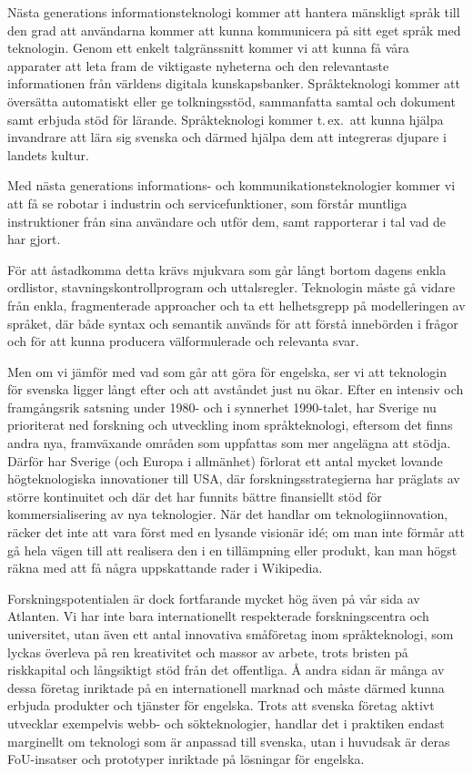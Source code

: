 \begin{multicols}{2}
Nästa generations informationsteknologi kommer att hantera mänskligt
språk till den grad att användarna kommer att kunna kommunicera på
sitt eget språk med teknologin. Genom ett enkelt talgränssnitt kommer
vi att kunna få våra apparater att \mbox{leta} fram de viktigaste
nyheterna och den relevant\-aste informationen från världens digitala
kunskaps\-banker. Språkteknologi kommer att översätta auto\-mat\-iskt
\mbox{eller} ge tolkningsstöd, sammanfatta samtal och doku\-ment samt
erbjuda stöd för lärande. Språkteknologi kommer t.\,ex.~att kunna
hjälpa invandrare att lära sig svenska och därmed hjälpa dem att
integrer\-as djupare i landets kultur.

Med nästa generations informations- och kom\-muni\-ka\-tions\-teknologier
kommer vi att få se robotar i indust\-rin och service\-funktioner, som
förstår munt\-liga instruktioner från sina användare och utför dem, samt
rapporterar i tal vad de har gjort.

För att åstadkomma detta krävs mjukvara som går långt bortom dagens
enkla ordlistor, stavnings\-kontroll\-program och uttalsregler. Teknologin
måste gå vidare från enkla, fragmenterade approacher och ta ett
helhetsgrepp på modelleringen av språket, där både syntax och semantik
används för att förstå innebörden i frågor och för att kunna producera
väl\-formu\-lerade och relevanta svar.

Men om vi jämför med vad som går att göra för engelska, ser vi att
teknologin för svenska ligger långt efter och att avståndet just nu
ökar. Efter en \mbox{intensiv} och framgångsrik satsning under 1980- och i
synnerhet 1990-talet, har Sverige nu prioriterat ned forskning och
utveckling inom språkteknologi, efter\-som det finns andra nya,
framväxande områden som uppfattas som mer angelägna att stödja.
Därför har Sverige (och Europa i allmänhet) förlorat ett antal mycket
lovande högteknologiska innovationer till USA, där
forskningsstrategierna har präglats av större kontinuitet och där det
har funnits bättre finansiellt stöd för kommersialisering av nya
teknologier. När det handlar om teknologiinnovation, räcker det inte
att vara först med en lysande visionär idé; om man inte förmår att gå
hela vägen till att realisera den i en tillämpning eller produkt, kan
man högst räkna med att få några uppskattande rader i Wikipedia.

Forskningspotentialen är dock fortfarande mycket hög även på vår sida
av Atlanten. Vi har inte \mbox{bara} inter\-nation\-ellt respekterade
forskningscentra och universitet, utan även ett antal innovativa
små\-före\-tag inom språkteknologi, som lyckas överleva på ren kreativitet
och massor av arbete, trots bristen på riskkapital och långsiktigt
stöd från det offent\-liga. Å andra sidan är många av dessa företag
inriktade på en internationell marknad och måste därmed kunna erbjuda
produkter och tjänster för engelska. Trots att svenska företag aktivt
utvecklar exempelvis webb- och sökteknologier, handlar det i prak\-tik\-en
endast marginellt om teknologi som är anpassad till \mbox{svenska}, utan i
huvudsak är deras FoU-insatser och prototyper inriktade på lösningar
för engelska.


\end{multicols}
